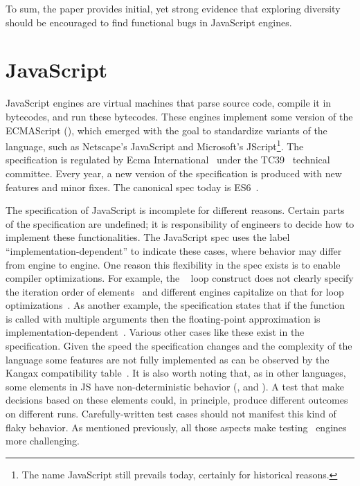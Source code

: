 \documentclass[sigconf,review, anonymous]{acmart}
\begin{document}
\vspace{1ex} To sum, the paper provides initial, yet strong evidence
that exploring diversity should be encouraged to find functional bugs
in JavaScript engines.

\section{JavaScript}
\label{sec:es6-design}
\label{sec:imp-dep-behavior}

JavaScript engines are virtual machines that parse source code,
compile it in bytecodes, and run these bytecodes. These engines
implement some version of the ECMAScript (\es{}), which emerged with
the goal to standardize variants of the language, such as Netscape's
JavaScript and Microsoft's JScript\footnote{The name JavaScript still
  prevails today, certainly for historical reasons.}. The \es{}
specification is regulated by Ecma International~\cite{es6-website}
under the TC39~\cite{tc39-github} technical committee.  Every year, a
new version of the \es{} specification is produced with new features
and minor fixes. The canonical spec today is
ES6~\cite{ecmas262-spec-repo,ecmas262-spec}.


The specification of JavaScript is incomplete for different
reasons. Certain parts of the specification are undefined; it is
responsibility of engineers to decide how to implement these
functionalities. The JavaScript spec uses the label
``implementation-dependent'' to indicate these cases, where behavior
may differ from engine to engine. One reason this flexibility in the
spec exists is to enable compiler optimizations. For example, the
\js\  loop construct does not clearly specify the
iteration order of
elements~\cite{so-forin-undefined,javascript-in-chrome} and different
engines capitalize on that for loop
optimizations~\cite{for-in-undefined}.  As another example, the
specification states that if the 
function is called with multiple arguments then the floating-point
approximation is
implementation-dependent~\cite{es6-toPrecision}. Various other cases
like these exist in the specification. Given the speed the
specification changes and the complexity of the language some features
are not fully implemented as can be observed by the Kangax
compatibility table~\cite{kangax}.  It is also worth noting that, as
in other languages, some elements in JS have non-deterministic
behavior (\eg{},  and ). A test
that make decisions based on these elements could, in principle,
produce different outcomes on different runs. Carefully-written test
cases should not manifest this kind of flaky behavior.  As mentioned
previously, all those aspects make testing \js\ engines more
challenging.
\end{document}
